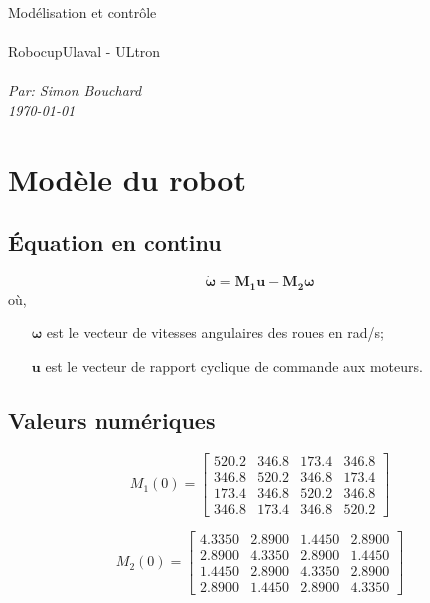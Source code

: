 \documentclass[12pt]{article}
\newcommand{\ClassName}{RobocupUlaval }
\newcommand{\ClassNumber}{ULtron}
\newcommand{\Subject}{Modélisation et contrôle}
\newcommand{\vect}[1]{\boldsymbol{#1}}
\begin{document}
\begin{center}
\normalfont \normalsize 
\huge \Subject\\
\horrule{0.5pt} \\[0.4cm]
\huge \ClassName - \ClassNumber \\ 
\horrule{0.5pt} \\[0.4cm]
\large \textit{Par: Simon Bouchard}\\
\textit{\today}
\end{center}



\section{Modèle du robot}

\subsection{Équation en continu}
\[
	\vect{\dot{\omega}} = \vect{M_1}\vect{u} - \vect{M_2}\vect{\omega}
\]
où,
\begin{itemize}
	\item[$\vect{\omega}$] est le vecteur de vitesses angulaires des roues en rad/s;
	\item[$\vect{u}$] est le vecteur de rapport cyclique de commande aux moteurs.
\end{itemize}

\subsection{Valeurs numériques}
\[
M_1(0) = \begin{bmatrix}
  520.2 & 346.8 & 173.4 & 346.8 \\[0.3em]
  346.8 & 520.2 & 346.8 & 173.4 \\[0.3em]
  173.4 & 346.8 & 520.2 & 346.8 \\[0.3em]
  346.8 & 173.4 & 346.8 & 520.2
     \end{bmatrix}
\]

\[
M_2(0) = \begin{bmatrix}
    4.3350  &  2.8900  &  1.4450  &  2.8900 \\[0.3em]
    2.8900  &  4.3350  &  2.8900  &  1.4450 \\[0.3em]
    1.4450  &  2.8900  &  4.3350  &  2.8900 \\[0.3em]
    2.8900  &  1.4450  &  2.8900  &  4.3350
     \end{bmatrix}
\]
\end{document}
